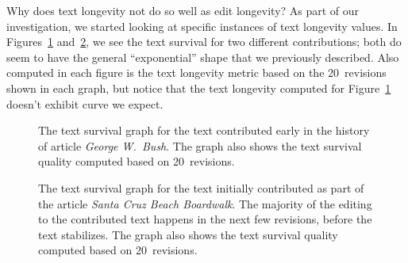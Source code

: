 
Why does text longevity not do so well as edit longevity?
As part of our investigation, we started looking at specific
instances of text longevity values.
In Figures~\ref{fig:ts-GeorgeWBush} and~\ref{fig:ts-SantaCruzBeachBoardwalk},
we see the text survival for two different contributions;
both do seem to have the general ``exponential'' shape
that we previously described.
Also computed in each figure is the text longevity metric based on
the 20~revisions shown in each graph, but notice that the text
longevity computed for
Figure~\ref{fig:ts-GeorgeWBush} doesn't exhibit curve we expect.

\begin{figure}[tbph]
\centering
{}
\caption{The text survival graph for the text contributed early
        in the history of article \textit{George W.~Bush}.
	The graph also shows the text survival quality
	computed based on 20~revisions.
	}
\label{fig:ts-GeorgeWBush}
\end{figure}

\begin{figure}[tbph]
\centering
{}
\caption{The text survival graph for the text initially contributed
	as part of the article \textit{Santa Cruz Beach Boardwalk}.
	The majority of the editing to the contributed text happens
	in the next few revisions, before the text stabilizes.
	The graph also shows the text survival quality
	computed based on 20~revisions.
	}
\label{fig:ts-SantaCruzBeachBoardwalk}
\end{figure}


